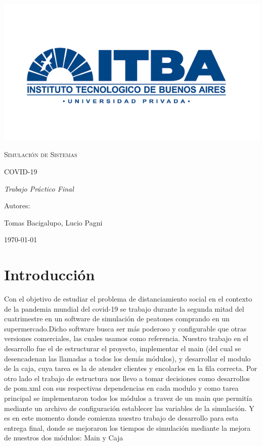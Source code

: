 \documentclass{article}
\author{Tomás Bacigalupo , Lucio Pagni}
\date{\today}
\author{Tomas Bacigalupo y Lucio Pagni}
\date{18/07/2020} %
\begin{document}
\begin{titlepage}
\centering
{\includegraphics[width=1\textwidth]{./images/logoitba.png}\par}
\vspace{1cm}
{\scshape\Large Simulaci\'on de Sistemas \par}
\vspace{3cm}
{\scshape\Huge COVID-19\par}
\vspace{3cm}
{\itshape\Large Trabajo Pr\'actico Final \par}
\vfill
{\Large Autores: \par}
{\Large Tomas Bacigalupo, Lucio Pagni\par}
\vfill
{\Large \today \par}
\end{titlepage}
\clearpage

\listoffigures   %
\clearpage
\listoftables %
 \clearpage

\tableofcontents
\clearpage

\section{Introducción}
Con el objetivo de estudiar el problema de distanciamiento social en el contexto de la pandemia mundial del covid-19 se trabajo durante la segunda mitad del cuatrimestre en un software de simulación de peatones comprando en un supermercado.Dicho software busca ser más poderoso y configurable que otras versiones comerciales, las cuales usamos como referencia. Nuestro trabajo en el desarrollo fue el de estructurar el proyecto, implementar el main (del cual se desencadenan las llamadas a todos los demás módulos),  y desarrollar el modulo de la caja, cuya tarea es la  de atender clientes y encolarlos en la fila correcta. Por otro lado el trabajo de estructura nos llevo a tomar decisiones como desarrollos de pom.xml con sus respectivas dependencias en cada modulo y como tarea principal se implementaron todos los módulos a travez de un main que permitía mediante un archivo de configuración establecer las variables de la simulación. Y es en este momento donde comienza nuestro trabajo de desarrollo para esta entrega final, donde se mejoraron los tiempos de simulación mediante la mejora de nuestros dos módulos: Main y Caja
\end{document}
